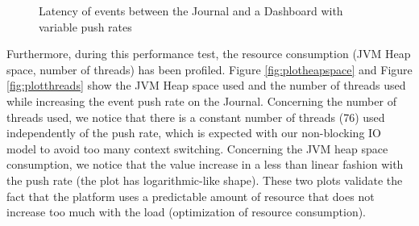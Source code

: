 \begin{figure}
  \begin{center} 
    \caption{Latency of events between the Journal and a Dashboard with variable push rates}
    \label{fig:severalrates}
  \end{center}
\end{figure}


Furthermore, during this performance test, the resource consumption (JVM Heap space, number of threads) has been profiled. Figure \ref{fig:plotheapspace} and Figure \ref{fig:plotthreads} show the JVM Heap space used and the number of threads used while increasing the event push rate on the Journal.
Concerning the number of threads used, we notice that there is a constant number of threads (76) used independently of the push rate, which is expected with our non-blocking IO model to avoid too many context switching.
Concerning the JVM heap space consumption, we notice that the value increase in a less than linear fashion with the push rate (the plot has logarithmic-like shape).
These two plots validate the fact that the platform uses a predictable amount of resource that does not increase too much with the load (optimization of resource consumption).

